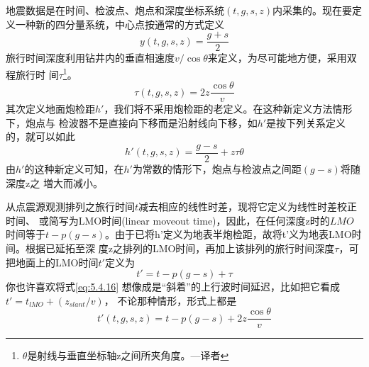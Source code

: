 地震数据是在时间、检波点、炮点和深度坐标系统$(t,g,s,z)$内采集的。现在要定
义一种新的四分量系统，中心点按通常的方式定义
\begin{equation}
y(t,g,s,z)=\frac{g+s}{2}
\label{eq:5.4.13}
\end{equation}
旅行时间深度利用钻井内的垂直相速度$v/\cos\theta$来定义，为尽可能地方便，采用双程旅行时
间$\tau$\footnote{
$\theta$是射线与垂直坐标轴z之间所夹角度。---译者
}。
\begin{equation}
\tau(t,g,s,z)=2z\frac{\cos\theta}{v}
\label{eq:5.4.14}
\end{equation} 
其次定义地面炮检距$h'$，我们将不采用炮检距的老定义。在这种新定义方法情形下，炮点与
检波器不是直接向下移而是沿射线向下移，如$h'$是按下列关系定义的，就可以如此
\begin{equation}
h'(t,g,s,z)=\frac{g-s}{2}+z\tau\theta
\label{eq:ex5.4.15}
\end{equation}
由$h'$的这种新定义可知，在$h'$为常数的情形下，炮点与检波点之间距$(g-s)$将随深度z之
増大而减小。

从点震源观测排列之旅行时间$t$减去相应的线性时差，现将它定义为线性时差校正时间、
或简写为LMO时间(linear moveout
time)，因此，在任何深度z时的$LMO$时间等于$t-p
(g-s)$。由于已将h'定义为地表半炮检距，故将t'义为地表LMO时间。根据已延拓至深
度z之排列的LMO时间，再加上该排列的旅行时间深度$\tau$，可把地面上的LMO时间$t'$定义为
\begin{equation}
t'=t-p(g-s)+\tau
\label{eq:5.4.16}
\end{equation}
你也许喜欢将式\ref{eq:5.4.16}
想像成是“斜着”的上行波时间延迟，比如把它看成$t'=t_{lMO}+(z_{slant}/v)$，
不论那种情形，形式上都是
\begin{equation}
t'(t,g,s,z)=t-p(g-s)+2z\frac{\cos\theta}{v}
\label{eq:5.4.17}
\end{equation}




